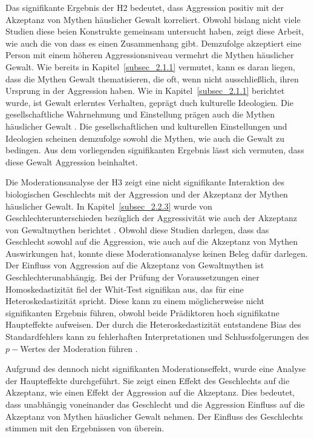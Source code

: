 Das signifikante Ergebnis der H2 bedeutet, dass Aggression positiv mit der Akzeptanz von Mythen häuslicher Gewalt korreliert. Obwohl bislang nicht viele Studien diese beien Konstrukte gemeinsam untersucht haben, zeigt diese Arbeit, wie auch die von \textcite{H2_u_3_Bhogal_2016, H1_moderation_2020} dass es einen Zusammenhang gibt. Demzufolge akzeptiert eine Person mit einem höheren Aggressionsniveau vermehrt die Mythen häuslicher Gewalt. Wie bereits in Kapitel~\ref{subsec_2.1.1} vermutet, kann es daran liegen, dass die Mythen Gewalt thematisieren, die oft, wenn nicht ausschließlich, ihren Ursprung in der Aggression haben. Wie \textcite{Def_Aggressivität_vs_violence} in Kapitel~\ref{subsec_2.1.1} berichtet wurde, ist Gewalt erlerntes Verhalten, geprägt duch kulturelle Ideologien. Die gesellschaftliche Wahrnehmung und Einstellung prägen auch die Mythen häuslicher Gewalt \parencite{Labelingtheory_plus, DVMAS_Peters}. Die gesellschaftlichen und kulturellen Einstellungen und Ideologien scheinen demzufolge sowohl die Mythen, wie auch die Gewalt zu bedingen. Aus dem vorliegenden signifikanten Ergebnis lässt sich vermuten, dass diese Gewalt Aggression beinhaltet.


Die Moderationsanalyse der H3 zeigt eine nicht signifikante Interaktion des biologischen Geschlechts mit der Aggression und der Akzeptanz der Mythen häuslicher Gewalt. In Kapitel~\ref{subsec_2.2.3} wurde von Geschlechterunterschieden bezüglich der Aggressivität wie auch der Akzeptanz von Gewaltmythen berichtet \parencite{H2_u_3_Bhogal_2016, H3_MFUnterschied, H3_2020}. Obwohl diese Studien darlegen, dass das Geschlecht sowohl auf die Aggression, wie auch auf die Akzeptanz von Mythen Auswirkungen hat, konnte diese Moderationsanalyse keinen Beleg dafür darlegen. Der Einfluss von Aggression auf die Akzeptanz von Gewaltmythen ist Geschlechterunabhängig. Bei der Prüfung der Voraussetzungen einer Homoskedastizität fiel der Whit-Test signifikan aus, das für eine Heteroskedastizität spricht. Diese kann zu einem möglicherweise nicht signifikanten Ergebnis führen, obwohl beide Prädiktoren hoch signifikatne Haupteffekte aufweisen.
Der durch die Heteroskedastizität entstandene Bias des Standardfehlers kann zu fehlerhaften Interpretationen und Schlussfolgerungen des $p-$Wertes der Moderation führen \parencite{Voraussetzung_Moderation}. 

Aufgrund des dennoch nicht signifikanten Moderationseffekt, wurde eine Analyse der Haupteffekte durchgeführt. Sie zeigt einen Effekt des Geschlechts auf die Akzeptanz, wie einen Effekt der Aggression auf die Akzeptanz. Dies bedeutet, dass unabhängig voneinander das Geschlecht und die Aggression Einfluss auf die Akzeptanz von Mythen häuslicher Gewalt nehmen. Der Einfluss des Geschlechts stimmen mit den Ergebnissen von \textcite{H3_2020} überein.


